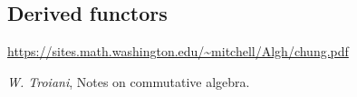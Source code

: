 \documentclass[12pt]{article}
\theoremstyle{plain}
\theoremstyle{definition}
\begin{document}
\subsection{Derived functors}



















\begin{thebibliography}{9}
 \url{https://sites.math.washington.edu/~mitchell/Algh/chung.pdf}

 \emph{W. Troiani}, Notes on commutative algebra.
\end{thebibliography}
\end{document}
